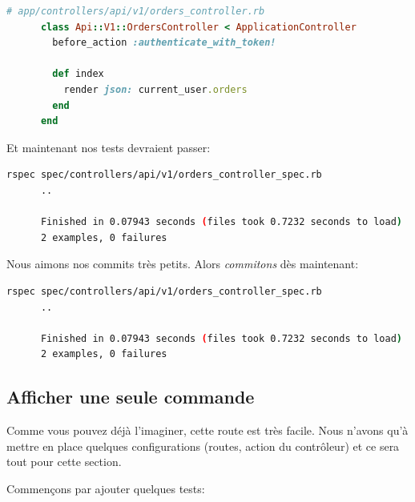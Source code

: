 \documentclass[]{report}
\begin{document}
    \begin{scriptsize}
      \begin{lstlisting}[language=ruby]
      # app/controllers/api/v1/orders_controller.rb
      class Api::V1::OrdersController < ApplicationController
        before_action :authenticate_with_token!

        def index
          render json: current_user.orders
        end
      end
      \end{lstlisting}
    \end{scriptsize}

    Et maintenant nos tests devraient passer:

    \begin{scriptsize}
      \begin{lstlisting}[language=bash]
      rspec spec/controllers/api/v1/orders_controller_spec.rb
      ..

      Finished in 0.07943 seconds (files took 0.7232 seconds to load)
      2 examples, 0 failures
      \end{lstlisting}
    \end{scriptsize}

    Nous aimons nos commits très petits. Alors \textit{commitons} dès maintenant:

    \begin{scriptsize}
      \begin{lstlisting}[language=bash]
      rspec spec/controllers/api/v1/orders_controller_spec.rb
      ..

      Finished in 0.07943 seconds (files took 0.7232 seconds to load)
      2 examples, 0 failures
      \end{lstlisting}
    \end{scriptsize}

    \subsection{Afficher une seule commande}

      Comme vous pouvez déjà l'imaginer, cette route est très facile. Nous n'avons qu'à mettre en place quelques configurations (routes, action du contrôleur) et ce sera tout pour cette section.

      Commençons par ajouter quelques tests:
\end{document}
